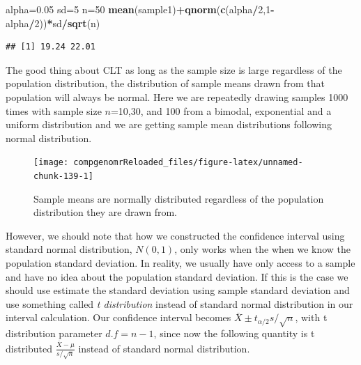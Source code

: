 \documentclass[12pt,]{krantz}
\newenvironment{Shaded}{\begin{snugshade}}{\end{snugshade}}
\newcommand{\DecValTok}[1]{\textcolor[rgb]{0.00,0.00,0.81}{#1}}
\newcommand{\FloatTok}[1]{\textcolor[rgb]{0.00,0.00,0.81}{#1}}
\newcommand{\KeywordTok}[1]{\textcolor[rgb]{0.13,0.29,0.53}{\textbf{#1}}}
\newcommand{\NormalTok}[1]{#1}
\newcommand{\OperatorTok}[1]{\textcolor[rgb]{0.81,0.36,0.00}{\textbf{#1}}}
\theoremstyle{definition}
\theoremstyle{definition}
\theoremstyle{definition}
\theoremstyle{remark}
\begin{document}
\begin{Shaded}
\begin{Highlighting}[]
\NormalTok{alpha=}\FloatTok{0.05}
\NormalTok{sd=}\DecValTok{5}
\NormalTok{n=}\DecValTok{50}
\KeywordTok{mean}\NormalTok{(sample1)}\OperatorTok{+}\KeywordTok{qnorm}\NormalTok{(}\KeywordTok{c}\NormalTok{(alpha}\OperatorTok{/}\DecValTok{2}\NormalTok{,}\DecValTok{1}\OperatorTok{-}\NormalTok{alpha}\OperatorTok{/}\DecValTok{2}\NormalTok{))}\OperatorTok{*}\NormalTok{sd}\OperatorTok{/}\KeywordTok{sqrt}\NormalTok{(n)}
\end{Highlighting}
\end{Shaded}

\begin{verbatim}
## [1] 19.24 22.01
\end{verbatim}

The good thing about CLT as long as the sample size is large regardless
of the population distribution, the distribution of sample means drawn
from that population will always be normal. Here we are repeatedly
drawing samples 1000 times with sample size \(n\)=10,30, and 100 from a
bimodal, exponential and a uniform distribution and we are getting
sample mean distributions following normal distribution.

\begin{figure}

{\centering \texttt{[image: compgenomrReloaded\_files/figure-latex/unnamed-chunk-139-1]} 

}

\caption{Sample means are normally distributed regardless of the population distribution they are drawn from.}\label{fig:unnamed-chunk-139}
\end{figure}

However, we should note that how we constructed the confidence interval
using standard normal distribution, \(N(0,1)\), only works when the when
we know the population standard deviation. In reality, we usually have
only access to a sample and have no idea about the population standard
deviation. If this is the case we should use estimate the standard
deviation using sample standard deviation and use something called
\emph{t distribution} instead of standard normal distribution in our
interval calculation. Our confidence interval becomes
\(\overline{X} \pm t_{\alpha/2}s/\sqrt{n}\), with t distribution
parameter \(d.f=n-1\), since now the following quantity is t distributed
\(\frac{\overline{X}-\mu}{s/\sqrt{n}}\) instead of standard normal
distribution.
\end{document}

